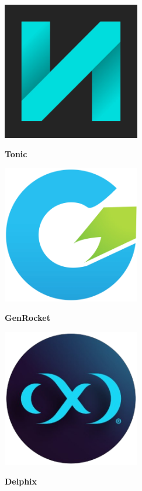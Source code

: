 \documentclass[
    aspectratio=169,
]{beamer}
\begin{document}
\begin{frame}[fragile]
\begin{minipage}[c]{0.35\textwidth}
\begin{minipage}[t]{0.48\textwidth}
            \includegraphics[width=0.45\textwidth, frame]{image/tonic}\par
            \textbf{Tonic}
        \end{minipage}%
        \hspace*{\fill}%
        \begin{minipage}[t]{0.48\textwidth}
            \centering
            
            \includegraphics[width=0.45\textwidth, frame]{image/genrocket}\par
            \textbf{GenRocket}
            
            \vspace{5pt}
            
            \includegraphics[width=0.45\textwidth, frame]{image/delphix}\par
            \textbf{Delphix}
        \end{minipage}%
        \hspace*{\fill}%
        

\end{minipage}
\end{frame}
\end{document}
